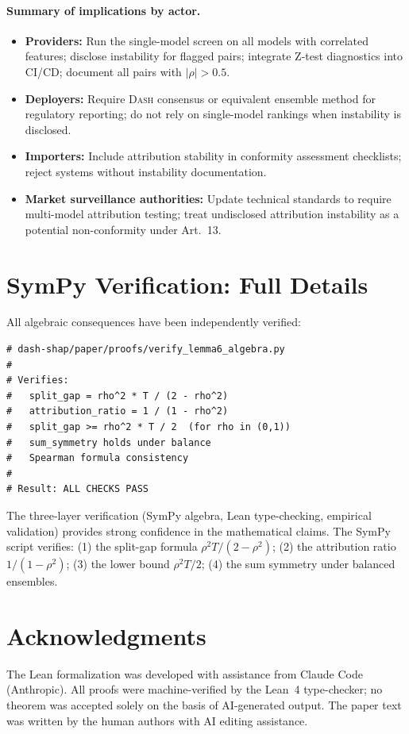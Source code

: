 \documentclass{article}
\newcommand{\DASH}{\textsc{Dash}}
\begin{document}
\paragraph{Summary of implications by actor.}
\begin{itemize}
    \item \textbf{Providers:} Run the single-model screen on all models with correlated features; disclose instability for flagged pairs; integrate Z-test diagnostics into CI/CD; document all pairs with $|\rho| > 0.5$.
    \item \textbf{Deployers:} Require \DASH{} consensus or equivalent ensemble method for regulatory reporting; do not rely on single-model rankings when instability is disclosed.
    \item \textbf{Importers:} Include attribution stability in conformity assessment checklists; reject systems without instability documentation.
    \item \textbf{Market surveillance authorities:} Update technical standards to require multi-model attribution testing; treat undisclosed attribution instability as a potential non-conformity under Art.~13.
\end{itemize}

\section{SymPy Verification: Full Details}

All algebraic consequences have been independently verified:

\begin{verbatim}
# dash-shap/paper/proofs/verify_lemma6_algebra.py
#
# Verifies:
#   split_gap = rho^2 * T / (2 - rho^2)
#   attribution_ratio = 1 / (1 - rho^2)
#   split_gap >= rho^2 * T / 2  (for rho in (0,1))
#   sum_symmetry holds under balance
#   Spearman formula consistency
#
# Result: ALL CHECKS PASS
\end{verbatim}

The three-layer verification (SymPy algebra, Lean type-checking, empirical validation) provides strong confidence in the mathematical claims. The SymPy script verifies: (1) the split-gap formula $\rho^2 T/(2-\rho^2)$; (2) the attribution ratio $1/(1-\rho^2)$; (3) the lower bound $\rho^2 T/2$; (4) the sum symmetry under balanced ensembles.

\section*{Acknowledgments}
The Lean formalization was developed with assistance from Claude Code (Anthropic). All proofs were machine-verified by the Lean~4 type-checker; no theorem was accepted solely on the basis of AI-generated output. The paper text was written by the human authors with AI editing assistance.



\end{document}
